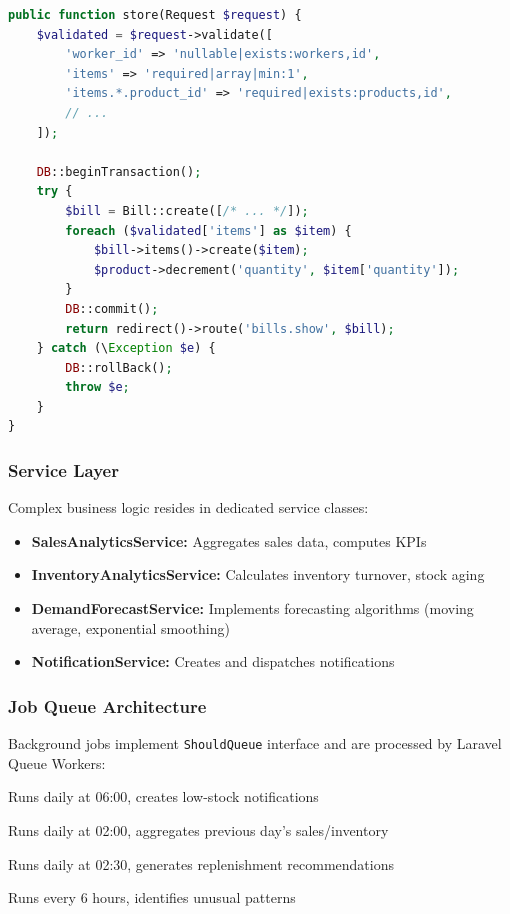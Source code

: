 \begin{lstlisting}[language=PHP,label=lst:controller-pattern]
public function store(Request $request) {
    $validated = $request->validate([
        'worker_id' => 'nullable|exists:workers,id',
        'items' => 'required|array|min:1',
        'items.*.product_id' => 'required|exists:products,id',
        // ...
    ]);
    
    DB::beginTransaction();
    try {
        $bill = Bill::create([/* ... */]);
        foreach ($validated['items'] as $item) {
            $bill->items()->create($item);
            $product->decrement('quantity', $item['quantity']);
        }
        DB::commit();
        return redirect()->route('bills.show', $bill);
    } catch (\Exception $e) {
        DB::rollBack();
        throw $e;
    }
}
\end{lstlisting}

\subsubsection{Service Layer}

Complex business logic resides in dedicated service classes:

\begin{itemize}
    \item \textbf{SalesAnalyticsService:} Aggregates sales data, computes KPIs
    \item \textbf{InventoryAnalyticsService:} Calculates inventory turnover, stock aging
    \item \textbf{DemandForecastService:} Implements forecasting algorithms (moving average, exponential smoothing)
    \item \textbf{NotificationService:} Creates and dispatches notifications
\end{itemize}

\subsubsection{Job Queue Architecture}

Background jobs implement \texttt{ShouldQueue} interface and are processed by Laravel Queue Workers:

\begin{description}[style=nextline]
    \item[CheckLowStockJob] Runs daily at 06:00, creates low-stock notifications
    \item[ComputeDailyAnalyticsJob] Runs daily at 02:00, aggregates previous day's sales/inventory
    \item[ComputeReorderSuggestionsJob] Runs daily at 02:30, generates replenishment recommendations
    \item[DetectAnomaliesJob] Runs every 6 hours, identifies unusual patterns
\end{description}

